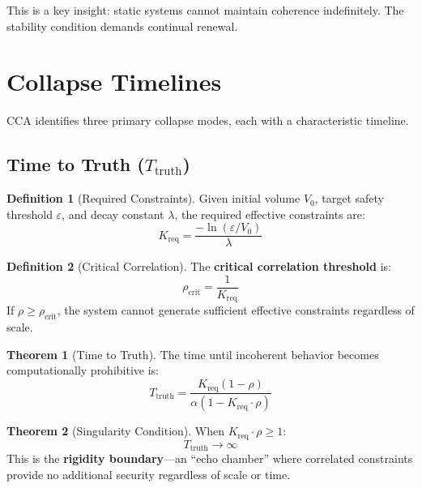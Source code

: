 \documentclass[11pt,a4paper]{article}
\theoremstyle{definition}
\newtheorem{definition}{Definition}[section]
\newtheorem{theorem}{Theorem}[section]
\theoremstyle{remark}
\newcommand{\Kreq}{K_{\text{req}}}
\newcommand{\Ttruth}{T_{\text{truth}}}
\newcommand{\rhocrit}{\rho_{\text{crit}}}
\begin{document}
This is a key insight: static systems cannot maintain coherence indefinitely. The stability condition demands continual renewal.

\section{Collapse Timelines}

CCA identifies three primary collapse modes, each with a characteristic timeline.

\subsection{Time to Truth ($\Ttruth$)}

\begin{definition}[Required Constraints]
Given initial volume $V_0$, target safety threshold $\varepsilon$, and decay constant $\lambda$, the required effective constraints are:
\begin{equation}
\Kreq = \frac{-\ln(\varepsilon/V_0)}{\lambda}
\end{equation}
\end{definition}

\begin{definition}[Critical Correlation]
The \textbf{critical correlation threshold} is:
\begin{equation}
\rhocrit = \frac{1}{\Kreq}
\end{equation}
If $\rho \geq \rhocrit$, the system cannot generate sufficient effective constraints regardless of scale.
\end{definition}

\begin{theorem}[Time to Truth]
The time until incoherent behavior becomes computationally prohibitive is:
\begin{equation}
\Ttruth = \frac{\Kreq(1-\rho)}{\alpha(1 - \Kreq \cdot \rho)}
\label{eq:Ttruth}
\end{equation}
\end{theorem}

\begin{theorem}[Singularity Condition]
When $\Kreq \cdot \rho \geq 1$:
\begin{equation}
\Ttruth \to \infty
\end{equation}
This is the \textbf{rigidity boundary}---an ``echo chamber'' where correlated constraints provide no additional security regardless of scale or time.
\end{theorem}
\end{document}
